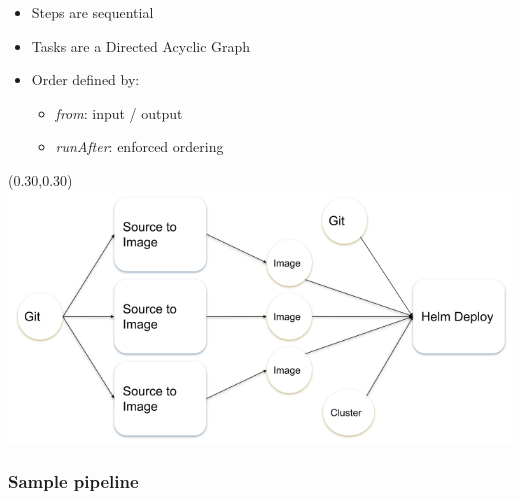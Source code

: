 \documentclass[aspectratio=169,11pt,hyperref={colorlinks=true}]{beamer}
\begin{document}
\begin{blackframe}
\begin{2columnsframe}
  {
    \begin{itemize}
      \item Steps are sequential
      \item Tasks are a Directed Acyclic Graph
      \item Order defined by:
      \begin{itemize}
        \item {\em from}: input / output
        \item {\em runAfter}: enforced ordering
      \end{itemize}
    \end{itemize}
  }
  {
  \begin{textblock*}{0.65\paperwidth}(0.30\paperwidth,0.30\paperheight)
    \centering
    \includegraphics[width=0.65\paperwidth]{img/pipeline.png}
  \end{textblock*}
  }
  \frametitle{Sample pipeline}
\end{2columnsframe}

%   
%   


\end{blackframe}
\end{document}
